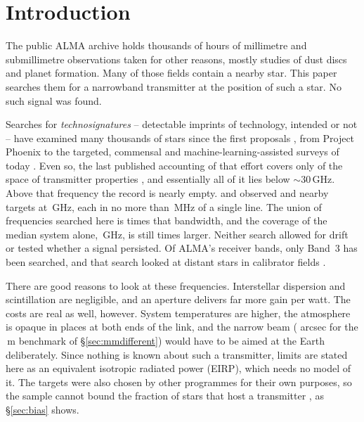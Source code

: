 \section{Introduction}
\label{sec:intro}

The public ALMA archive holds thousands of hours of millimetre and
submillimetre observations taken for other reasons, mostly studies of dust
discs and planet formation. Many of those fields contain a nearby star.
This
paper searches them for a narrowband transmitter at the position of such a
star. No such signal was found.

Searches for \emph{technosignatures} -- detectable imprints of technology,
intended or not \citep{Sheikh2020,SETIreview2025} -- have examined many
thousands of stars since the first proposals
\citep{CocconiMorrison1959,Drake1960}, from Project Phoenix
\citep{Tarter2001,Backus2002} to the targeted, commensal and
machine-learning-assisted surveys of today
\citep{Zhang2020,Czech2021,FAST3IATLAS2025,LOFARdualsite2023,Choza2024,Morrison2023,Tremblay2024,SRT2025,Ma2023,GLOBULAR2025,AnomalyParkesGBT2025}.
Even so, the last published accounting of that effort covers only
\HaystackFrac{} of the space of transmitter properties \citep{Wright2018},
and essentially all of it lies below ${\sim}30$\,GHz. Above that frequency
the record is nearly empty. \citet{Steffes1994} and \citet{Mauersberger1996}
observed \SbPriorNStarA{} and \SbPriorNStarB{} nearby targets at
\SbPriorFreqGHz\,GHz, each in no more than \SbPriorBandMHz\,MHz of a single
line. The union of frequencies searched here is \SbPriorRatio{} times that
bandwidth, and the coverage of the median system alone, \SysUnionAMed\,GHz,
is still \SbPriorRatioSysMed{} times larger. Neither search allowed for drift or tested whether a signal
persisted. Of ALMA's receiver bands, only Band~3 has been searched, and that search
looked at distant stars in calibrator fields \citep{Mason2025}.

There are good reasons to look at these frequencies. Interstellar dispersion
and scintillation are negligible, and an aperture delivers far more gain per
watt. The costs are real as well, however. System temperatures are higher,
the atmosphere is opaque in places at both ends of the link, and the narrow
beam (\BmArcsec{} arcsec for the \BenchDiam\,m benchmark of
\S\ref{sec:mmdifferent}) would have to be aimed at the Earth deliberately.
Since nothing is known about such a transmitter, limits are stated here as
an equivalent isotropic radiated power (EIRP), which needs no model of it.
The targets were also chosen by other programmes for their own purposes, so
the sample cannot bound the fraction of stars that host a transmitter
\citep{Wright2018,Margot2023,EarthDetectingEarth2025}, as \S\ref{sec:bias}
shows.

